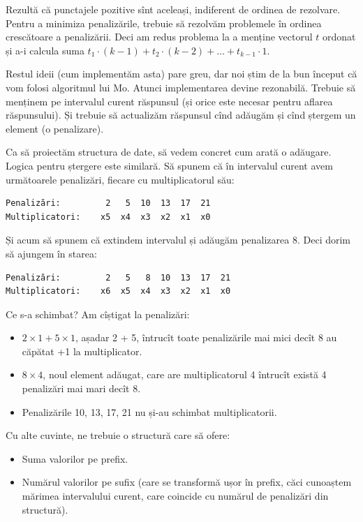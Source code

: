 \documentclass[../main.tex]{subfiles}
\begin{document}
Rezultă că punctajele pozitive sînt aceleași, indiferent de ordinea de rezolvare. Pentru a minimiza penalizările, trebuie să rezolvăm problemele în ordinea crescătoare a penalizării. Deci am redus problema la a menține vectorul $t$ ordonat și a-i calcula suma $t_1 \cdot (k-1) + t_2 \cdot (k-2) + \dots + t_{k-1} \cdot 1$.

Restul ideii (cum implementăm asta) pare greu, dar noi știm de la bun început că vom folosi algoritmul lui Mo. Atunci implementarea devine rezonabilă. Trebuie să menținem pe intervalul curent răspunsul (și orice este necesar pentru aflarea răspunsului). Și trebuie să actualizăm răspunsul cînd adăugăm și cînd ștergem un element (o penalizare).

Ca să proiectăm structura de date, să vedem concret cum arată o adăugare. Logica pentru ștergere este similară. Să spunem că în intervalul curent avem următoarele penalizări, fiecare cu multiplicatorul său:

\begin{verbatim}
Penalizări:         2   5  10  13  17  21
Multiplicatori:    x5  x4  x3  x2  x1  x0
\end{verbatim}

Și acum să spunem că extindem intervalul și adăugăm penalizarea 8. Deci dorim să ajungem în starea:

\begin{verbatim}
Penalizări:         2   5   8  10  13  17  21
Multiplicatori:    x6  x5  x4  x3  x2  x1  x0
\end{verbatim}

Ce s-a schimbat? Am cîștigat la penalizări:

\begin{itemize}
  \item $2 \times 1 + 5 \times 1$, așadar 2 + 5, întrucît toate penalizările mai mici decît 8 au căpătat +1 la multiplicator.

  \item $8 \times 4$, noul element adăugat, care are multiplicatorul 4 întrucît există 4 penalizări mai mari decît 8.

  \item Penalizările 10, 13, 17, 21 nu și-au schimbat multiplicatorii.
\end{itemize}

Cu alte cuvinte, ne trebuie o structură care să ofere:

\begin{itemize}
  \item Suma valorilor pe prefix.

  \item Numărul valorilor pe sufix (care se transformă ușor în prefix, căci cunoaștem mărimea intervalului curent, care coincide cu numărul de penalizări din structură).
\end{itemize}
\end{document}
